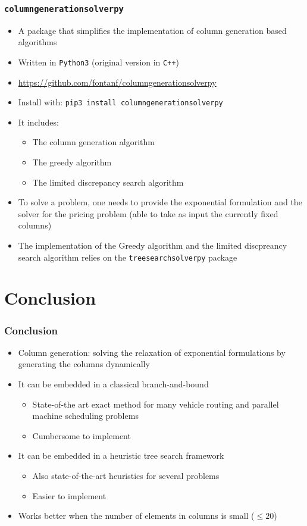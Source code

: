 \documentclass[10pt]{beamer}
\begin{document}
\begin{frame}
  \frametitle{\texttt{columngenerationsolverpy}}

  \begin{itemize}
    \item A package that simplifies the implementation of column generation based algorithms
    \item Written in \texttt{Python3} (original version in \texttt{C++})
    \item \url{https://github.com/fontanf/columngenerationsolverpy}
    \item Install with: \texttt{pip3 install columngenerationsolverpy}
    \item It includes:
      \begin{itemize}
        \item The column generation algorithm
        \item The greedy algorithm
        \item The limited discrepancy search algorithm
      \end{itemize}
    \item To solve a problem, one needs to provide the exponential formulation and the solver for the pricing problem (able to take as input the currently fixed columns)
    \item The implementation of the Greedy algorithm and the limited discpreancy search algorithm relies on the \texttt{treesearchsolverpy} package
  \end{itemize}
\end{frame}

\section{Conclusion}

\begin{frame}
  \frametitle{Conclusion}

  \begin{itemize}
    \item Column generation: solving the relaxation of exponential formulations by generating the columns dynamically
    \item It can be embedded in a classical branch-and-bound
      \begin{itemize}
        \item State-of-the art exact method for many vehicle routing and parallel machine scheduling problems
        \item Cumbersome to implement
      \end{itemize}
    \item It can be embedded in a heuristic tree search framework
      \begin{itemize}
        \item Also state-of-the-art heuristics for several problems
        \item Easier to implement
      \end{itemize}
    \item Works better when the number of elements in columns is small ($\le 20$)
  \end{itemize}
\end{frame}

\maketitle
\end{document}

